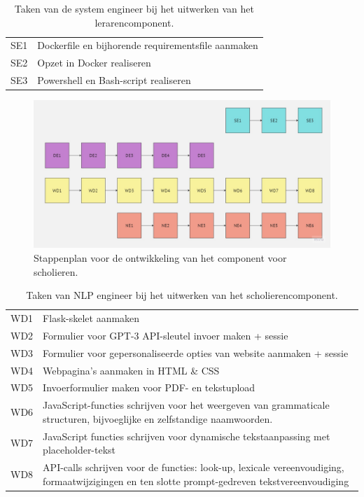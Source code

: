 \begin{center}
	\begin{table}
		\begin{tabular}{|m{2cm}|m{12cm}|}
			\hline
			SE1 & Dockerfile en bijhorende requirementsfile aanmaken \\
			SE2 & Opzet in Docker realiseren \\
			SE3 & Powershell en Bash-script realiseren \\
			\hline
		\end{tabular}
		\caption{Taken van de system engineer bij het uitwerken van het lerarencomponent.}
		\label{table:tasks-system-engineer}
	\end{table}
\end{center}

\begin{figure}[H]
	\includegraphics[width=\linewidth]{img/flowchart-development-scholars.jpg}
	\caption{Stappenplan voor de ontwikkeling van het component voor scholieren.}
	\label{img:stappenplan-scholars}
\end{figure}

\begin{center}
	\begin{table}
		\begin{tabular}{ | m{2cm} | m{12cm} | } 
			\hline
			WD1 & Flask-skelet aanmaken \\
			WD2 & Formulier voor GPT-3 API-sleutel invoer maken + sessie \\
			WD3 & Formulier voor gepersonaliseerde opties van website aanmaken + sessie \\
			WD4 & Webpagina's aanmaken in HTML \& CSS \\
			WD5 & Invoerformulier maken voor PDF- en tekstupload \\
			WD6 & JavaScript-functies schrijven voor het weergeven van grammaticale structuren, bijvoeglijke en zelfstandige naamwoorden. \\
			WD7 & JavaScript functies schrijven voor dynamische tekstaanpassing met placeholder-tekst \\
			WD8 & API-calls schrijven voor de functies: look-up, lexicale vereenvoudiging, formaatwijzigingen en ten slotte prompt-gedreven tekstvereenvoudiging \\
			\hline
		\end{tabular}
		\caption{Taken van NLP engineer bij het uitwerken van het scholierencomponent.}
		\label{table:tasks-nlp-engineer-scholars}
	\end{table}
\end{center}

